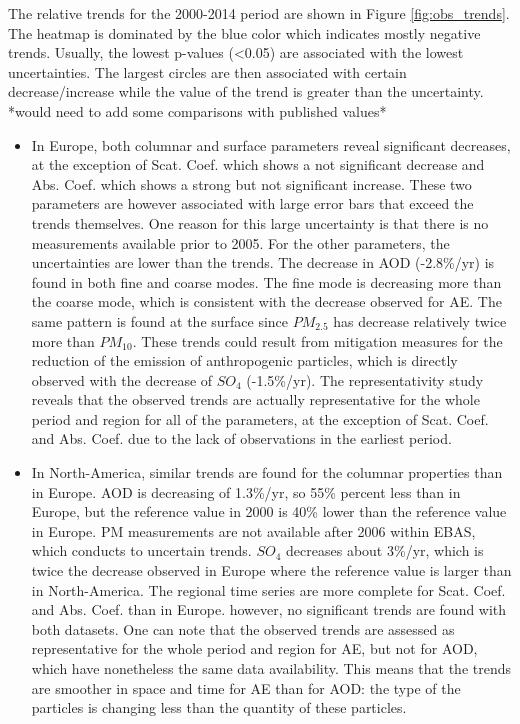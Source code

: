 \documentclass[journal abbreviation, manuscript]{copernicus}
\begin{document}
The relative trends for the 2000-2014 period are shown in Figure \ref{fig:obs_trends}. The heatmap is dominated by the blue color which indicates mostly negative trends. Usually, the lowest p-values (<0.05) are associated with the lowest uncertainties. The largest circles are then associated with certain decrease/increase while the value of the trend is greater than the uncertainty.
*would need to add some comparisons with published values*
\begin{itemize}
    \item In Europe, both columnar and surface parameters reveal significant decreases, at the exception of Scat. Coef. which shows a not significant decrease and Abs. Coef. which shows a strong but not significant increase. These two parameters are however associated with large error bars that exceed the trends themselves. One reason for this large uncertainty is that there is no measurements available prior to 2005. For the other parameters, the uncertainties are lower than the trends. The decrease in AOD (-2.8\%/yr) is found in both fine and coarse modes. The fine mode is decreasing more than the coarse mode, which is consistent with the decrease observed for AE. The same pattern is found at the surface since $PM_{2.5}$ has decrease relatively twice more than $PM_{10}$. These trends could result from mitigation measures for the reduction of the emission of anthropogenic particles, which is directly observed with the decrease of $SO_{4}$ (-1.5\%/yr).
    The representativity study reveals that the observed trends are actually representative for the whole period and region for all of the parameters, at the exception of Scat. Coef. and Abs. Coef. due to the lack of observations in the earliest period.
    \item In North-America, similar trends are found for the columnar properties than in Europe. AOD is decreasing of 1.3\%/yr, so 55\% percent less than in Europe, but the reference value in 2000 is 40\% lower than the reference value in Europe. PM measurements are not available after 2006 within EBAS, which conducts to uncertain trends. $SO_{4}$ decreases about 3\%/yr, which is twice the decrease observed in Europe where the reference value is larger than in North-America. The regional time series are more complete for Scat. Coef. and Abs. Coef. than in Europe. however, no significant trends are found with both datasets. One can note that the observed trends are assessed as representative for the whole period and region for AE, but not for AOD, which have nonetheless the same data availability. This means that the trends are smoother in space and time for AE than for AOD: the type of the particles is changing less than the quantity of these particles.

\end{itemize}
\end{document}
